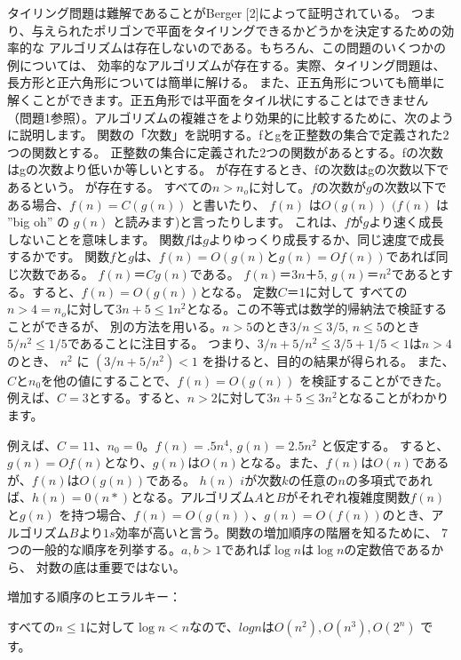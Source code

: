 
タイリング問題は難解であることがBerger [2]によって証明されている。
つまり、与えられたポリゴンで平面をタイリングできるかどうかを決定するための効率的な
アルゴリズムは存在しないのである。もちろん、この問題のいくつかの例については、
効率的なアルゴリズムが存在する。実際、タイリング問題は、長方形と正六角形については簡単に解ける。
また、正五角形についても簡単に解くことができます。正五角形では平面をタイル状にすることはできません
（問題1参照）。アルゴリズムの複雑さをより効果的に比較するために、次のように説明します。
関数の「次数」を説明する。fとgを正整数の集合で定義された2つの関数とする。
正整数の集合に定義された2つの関数があるとする。fの次数はgの次数より低いか等しいとする。
が存在するとき、fの次数はgの次数以下であるという。
が存在する。
すべての$n>n_o$に対して。$f$の次数が$g$の次数以下である場合、$f(n) = C(g(n))$ と書いたり、
$f(n)$ は$O(g(n))$ $(f(n)$ は ”big oh” の $g(n)$ と読みます)と言ったりします。
これは、$f$が$g$より速く成長しないことを意味します。
関数$f$は$g$よりゆっくり成長するか、同じ速度で成長するかです。
関数$f$と$g$は、$f(n)=O(g(n) と g(n) = Of(n))$であれば同じ次数である。
$f(n)＝Cg(n)$である。
$f(n)＝3n＋5$, $g(n)＝n^2$であるとする。すると、$f(n)=O(g(n))$となる。
定数$C＝1$に対して
すべての$n>4 = n_o$に対して$3n+5 \leq 1n^2$となる。この不等式は数学的帰納法で検証することができるが、
別の方法を用いる。$n>5$のとき$3/n \leq 3/5$, $n \leq 5$のとき$5/n^2 \leq 1/5$であることに注目する。
つまり、$3/n+5/n^2\leq 3/5 + 1/5 < 1$は$n>4$のとき、
$n^2$ に $(3/n + 5/n^2) < 1$ を掛けると、目的の結果が得られる。
また、$C$と$n_0$を他の値にすることで、$f(n) = O(g(n))$ を検証することができた。
例えば、$C = 3$とする。すると、$n>2$に対して$3n +5 \leq 3n^2$となることがわかります。

例えば、$C =11$、$n_0 = 0$。$f(n) = .5n^4$, $g(n) = 2.5n^2$ と仮定する。
すると、$g(n)=Of(n)$となり、$g(n)はO(n)$となる。また、$f(n)はO(n)$であるが、$f(n)$は$O(g(n))$である。
$h(n)$ $i$が次数$k$の任意の$n$の多項式であれば、$h(n) = 0(n*)$となる。アルゴリズム$A$と$B$がそれぞれ複雑度関数$f(n)$と$g(n)$
を持つ場合、$f(n)=O(g(n))$、$g(n)=O(f(n))$のとき、アルゴリズム$B$より$1s$効率が高いと言う。関数の増加順序の階層を知るために、
7つの一般的な順序を列挙する。$a,b>1$であれば$\log n$は$\log n$の定数倍であるから、
対数の底は重要ではない。

増加する順序のヒエラルキー：

すべての$n \leq 1$に対して$\log n < n$なので、$log n$は$O(n^2), O(n^3), O(2^n)$ です。